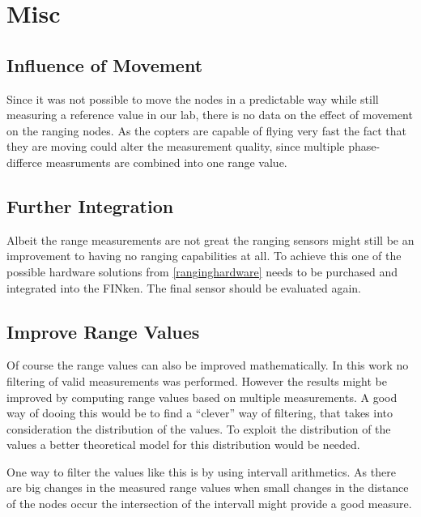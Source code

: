 \section{Misc}
\subsection{Influence of Movement}
Since it was not possible to move the nodes in a predictable way while still measuring a reference value in our lab, there is no data on the effect of movement on the ranging nodes.
As the copters are capable of flying very fast the fact that they are moving could alter the measurement quality, since multiple phase-differce measruments are combined into one range value.

\subsection{Further Integration}

Albeit the range measurements are not great the ranging sensors might still be an improvement to having no ranging capabilities at all.
To achieve this one of the possible hardware solutions from \autoref{ranginghardware} needs to be purchased and integrated into the FINken.
The final sensor should be evaluated again.

\subsection{Improve Range Values}

Of course the range values can also be improved mathematically.
In this work no filtering of valid measurements was performed.
However the results might be improved by computing range values based on multiple measurements.
A good way of dooing this would be to find a “clever” way of filtering, that takes into consideration the distribution of the values.
To exploit the distribution of the values a better theoretical model for this distribution would be needed.

One way to filter the values like this is by using intervall arithmetics.
As there are big changes in the measured range values when small changes in the distance of the nodes occur the intersection of the intervall might provide a good measure.




